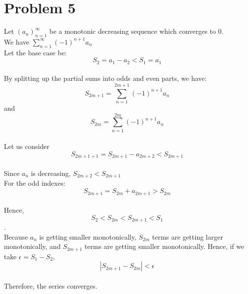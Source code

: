 \documentclass{article}
\begin{document}
\section*{Problem 5}
Let $(a_n)_{n=1}^{\infty}$ be a monotonic decreasing sequence which converges to 0.
\\We have $\sum_{n=1}^{\infty} (-1)^{n+1}a_n$
\\Let the base case be: $$S_2 = a_1 - a_2 < S_1 = a_1$$
\\By splitting up the partial sums into odds and even parts, we have: $$S_{2m+1} = \sum_{n=1}^{2m+1} (-1)^{n+1}a_n$$ and $$S_{2m} = \sum_{n=1}^{2m} (-1)^{n+1} a_n$$
\\Let us consider $$S_{2m+1 + 1} = S_{2m+1} - a_{2m+2} < S_{2m+1}$$
\\Since $a_n$ is decreasing, $S_{2m+2} < S_{2m+1}$
\\For the odd indexes: $$S_{2m + 1} = S_{2m} + a_{2m + 1} > S_{2m}$$
\\Hence, $$S_2 < S_{2m} < S_{2m+1} < S_1$$.
\\Because $a_n$ is getting smaller monotonically, $S_{2m}$ terms are getting larger monotonically, and $S_{2m+1}$ terms are getting smaller monotonically. Hence, if we take $\epsilon = S_1 - S_2,$ $$|S_{2m+1} - S_{2m}| < \epsilon$$
\\Therefore, the series converges.
\end{document}
